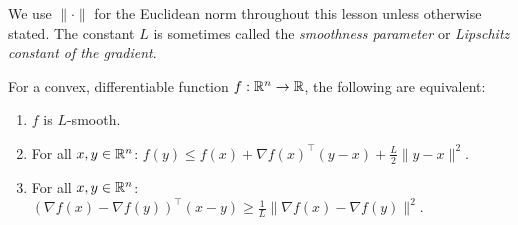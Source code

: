 \documentclass[11pt,a4paper]{article}
\begin{document}
\begin{remark}\label{rem:smooth-notation}
We use $\|\cdot\|$ for the Euclidean norm throughout this lesson unless
otherwise stated. The constant $L$ is sometimes called the \emph{smoothness
parameter} or \emph{Lipschitz constant of the gradient}.
\end{remark}

\begin{proposition}%
\label{prop:smooth-equiv}
For a convex, differentiable function $f : \mathbb{R}^n \to \mathbb{R}$, the following are
equivalent:
\begin{enumerate}[label=(\roman*)]
  \item\label{it:lip-grad} $f$ is $L$-smooth.
  \item\label{it:quad-upper} For all $x, y \in \mathbb{R}^n$:
    $f(y) \le f(x) + \nabla f(x)^\top(y - x) + \frac{L}{2}\|y - x\|^2$.
  \item\label{it:cocoercive} For all $x, y \in \mathbb{R}^n$:
    $(\nabla f(x) - \nabla f(y))^\top(x - y) \ge \frac{1}{L}
    \|\nabla f(x) - \nabla f(y)\|^2$.
\end{enumerate}
\end{proposition}
\end{document}
